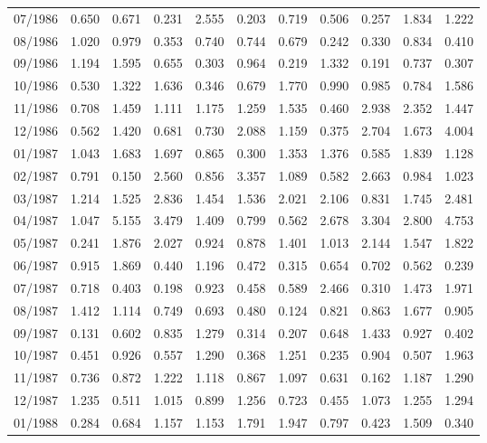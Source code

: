 \begin{tabular}{lrrrrrrrrrr}
07/1986 &  0.650 &  0.671 &  0.231 &  2.555 &  0.203 &  0.719 &  0.506 &  0.257 &  1.834 &  1.222 \\
08/1986 &  1.020 &  0.979 &  0.353 &  0.740 &  0.744 &  0.679 &  0.242 &  0.330 &  0.834 &  0.410 \\
09/1986 &  1.194 &  1.595 &  0.655 &  0.303 &  0.964 &  0.219 &  1.332 &  0.191 &  0.737 &  0.307 \\
10/1986 &  0.530 &  1.322 &  1.636 &  0.346 &  0.679 &  1.770 &  0.990 &  0.985 &  0.784 &  1.586 \\
11/1986 &  0.708 &  1.459 &  1.111 &  1.175 &  1.259 &  1.535 &  0.460 &  2.938 &  2.352 &  1.447 \\
12/1986 &  0.562 &  1.420 &  0.681 &  0.730 &  2.088 &  1.159 &  0.375 &  2.704 &  1.673 &  4.004 \\
01/1987 &  1.043 &  1.683 &  1.697 &  0.865 &  0.300 &  1.353 &  1.376 &  0.585 &  1.839 &  1.128 \\
02/1987 &  0.791 &  0.150 &  2.560 &  0.856 &  3.357 &  1.089 &  0.582 &  2.663 &  0.984 &  1.023 \\
03/1987 &  1.214 &  1.525 &  2.836 &  1.454 &  1.536 &  2.021 &  2.106 &  0.831 &  1.745 &  2.481 \\
04/1987 &  1.047 &  5.155 &  3.479 &  1.409 &  0.799 &  0.562 &  2.678 &  3.304 &  2.800 &  4.753 \\
05/1987 &  0.241 &  1.876 &  2.027 &  0.924 &  0.878 &  1.401 &  1.013 &  2.144 &  1.547 &  1.822 \\
06/1987 &  0.915 &  1.869 &  0.440 &  1.196 &  0.472 &  0.315 &  0.654 &  0.702 &  0.562 &  0.239 \\
07/1987 &  0.718 &  0.403 &  0.198 &  0.923 &  0.458 &  0.589 &  2.466 &  0.310 &  1.473 &  1.971 \\
08/1987 &  1.412 &  1.114 &  0.749 &  0.693 &  0.480 &  0.124 &  0.821 &  0.863 &  1.677 &  0.905 \\
09/1987 &  0.131 &  0.602 &  0.835 &  1.279 &  0.314 &  0.207 &  0.648 &  1.433 &  0.927 &  0.402 \\
10/1987 &  0.451 &  0.926 &  0.557 &  1.290 &  0.368 &  1.251 &  0.235 &  0.904 &  0.507 &  1.963 \\
11/1987 &  0.736 &  0.872 &  1.222 &  1.118 &  0.867 &  1.097 &  0.631 &  0.162 &  1.187 &  1.290 \\
12/1987 &  1.235 &  0.511 &  1.015 &  0.899 &  1.256 &  0.723 &  0.455 &  1.073 &  1.255 &  1.294 \\
01/1988 &  0.284 &  0.684 &  1.157 &  1.153 &  1.791 &  1.947 &  0.797 &  0.423 &  1.509 &  0.340 \\

\end{tabular}
